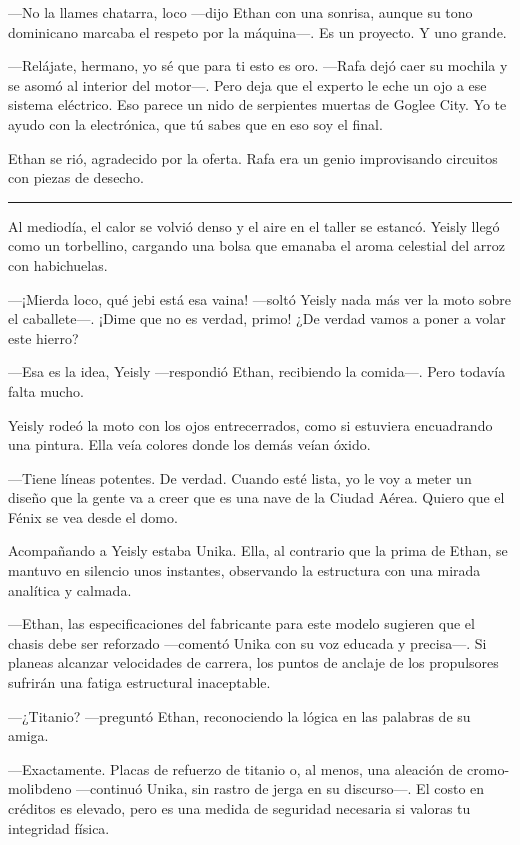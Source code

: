 \documentclass[12pt,a4paper]{book}
\begin{document}
---No la llames chatarra, loco ---dijo Ethan con una sonrisa, aunque su tono dominicano marcaba el respeto por la máquina---. Es un proyecto. Y uno grande.

---Relájate, hermano, yo sé que para ti esto es oro. ---Rafa dejó caer su mochila y se asomó al interior del motor---. Pero deja que el experto le eche un ojo a ese sistema eléctrico. Eso parece un nido de serpientes muertas de Goglee City. Yo te ayudo con la electrónica, que tú sabes que en eso soy el final.

Ethan se rió, agradecido por la oferta. Rafa era un genio improvisando circuitos con piezas de desecho.

\bigskip
\noindent\rule{\textwidth}{0.4pt}
\bigskip

Al mediodía, el calor se volvió denso y el aire en el taller se estancó. Yeisly llegó como un torbellino, cargando una bolsa que emanaba el aroma celestial del arroz con habichuelas.

---¡Mierda loco, qué jebi está esa vaina! ---soltó Yeisly nada más ver la moto sobre el caballete---. ¡Dime que no es verdad, primo! ¿De verdad vamos a poner a volar este hierro?

---Esa es la idea, Yeisly ---respondió Ethan, recibiendo la comida---. Pero todavía falta mucho.

Yeisly rodeó la moto con los ojos entrecerrados, como si estuviera encuadrando una pintura. Ella veía colores donde los demás veían óxido.

---Tiene líneas potentes. De verdad. Cuando esté lista, yo le voy a meter un diseño que la gente va a creer que es una nave de la Ciudad Aérea. Quiero que el Fénix se vea desde el domo.

Acompañando a Yeisly estaba Unika. Ella, al contrario que la prima de Ethan, se mantuvo en silencio unos instantes, observando la estructura con una mirada analítica y calmada.

---Ethan, las especificaciones del fabricante para este modelo sugieren que el chasis debe ser reforzado ---comentó Unika con su voz educada y precisa---. Si planeas alcanzar velocidades de carrera, los puntos de anclaje de los propulsores sufrirán una fatiga estructural inaceptable.

 ---¿Titanio? ---preguntó Ethan, reconociendo la lógica en las palabras de su amiga.

 ---Exactamente. Placas de refuerzo de titanio o, al menos, una aleación de cromo-molibdeno ---continuó Unika, sin rastro de jerga en su discurso---. El costo en créditos es elevado, pero es una medida de seguridad necesaria si valoras tu integridad física.
\end{document}
